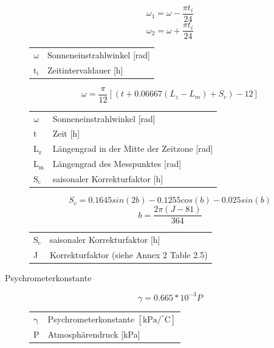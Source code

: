 \begin{description}
\begin{equation}
\label{eq:omega_i}
\omega_1=\omega-\frac{\pi t_i}{24}
\end{equation}
\begin{equation}
\omega_2=\omega+\frac{\pi t_i}{24}
\end{equation}
\begin{table}[H]
\centering
\begin{tabular}{ll}
$\mathrm{\omega}$ & Sonneneinstrahlwinkel [rad]\\
$\mathrm{t_i}$ & Zeitintervaldauer [h]\\
\end{tabular}
\end{table}

\begin{equation}
\label{eq:omega}
\omega=\frac{\pi}{12}[(t+0.06667(L_z-L_m)+S_c)-12]
\end{equation}
\begin{table}[H]
\centering
\begin{tabular}{ll}
$\mathrm{\omega}$ & Sonneneinstrahlwinkel [rad]\\
t & Zeit [h]\\
$\mathrm{L_z}$ & Längengrad in der Mitte der Zeitzone [rad]\\
$\mathrm{L_m}$ & Längengrad des Messpunktes [rad]\\
$\mathrm{S_c}$ & saisonaler Korrekturfaktor [h]\\
\end{tabular}
\end{table}

\begin{equation}
\label{eq:s_c}
S_c=0.1645sin(2b)-0.1255cos(b)-0.025sin(b)
\end{equation}
\begin{equation}
b=\frac{2\pi(J-81)}{364}
\end{equation}
\begin{table}[H]
\centering
\begin{tabular}{ll}
$\mathrm{S_c}$ & saisonaler Korrekturfaktor [h]\\
J & Korrekturfaktor (siehe \cite{fao} Annex 2 Table 2.5)\\
\end{tabular}
\end{table}

\item[Psychrometerkonstante]
\begin{equation}
\label{eq:gamma}
\gamma=0.665*10^{-3} P
\end{equation}
\begin{table}[H]
\centering
\begin{tabular}{ll}
$\mathrm{\gamma}$ & Psychrometerkonstante $\mathrm{[kPa/^{\circ}C]}$\\
P & Atmosphärendruck [kPa]\\
\end{tabular}
\end{table}


\end{description}
